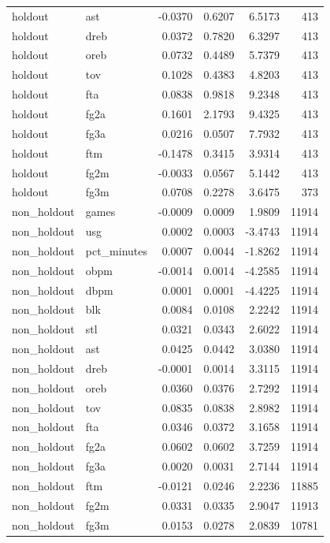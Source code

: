 \begin{table}
\begin{tabular}{llrrrr}
holdout & ast & -0.0370 & 0.6207 & 6.5173 & 413 \\
holdout & dreb & 0.0372 & 0.7820 & 6.3297 & 413 \\
holdout & oreb & 0.0732 & 0.4489 & 5.7379 & 413 \\
holdout & tov & 0.1028 & 0.4383 & 4.8203 & 413 \\
holdout & fta & 0.0838 & 0.9818 & 9.2348 & 413 \\
holdout & fg2a & 0.1601 & 2.1793 & 9.4325 & 413 \\
holdout & fg3a & 0.0216 & 0.0507 & 7.7932 & 413 \\
holdout & ftm & -0.1478 & 0.3415 & 3.9314 & 413 \\
holdout & fg2m & -0.0033 & 0.0567 & 5.1442 & 413 \\
holdout & fg3m & 0.0708 & 0.2278 & 3.6475 & 373 \\
non\_holdout & games & -0.0009 & 0.0009 & 1.9809 & 11914 \\
non\_holdout & usg & 0.0002 & 0.0003 & -3.4743 & 11914 \\
non\_holdout & pct\_minutes & 0.0007 & 0.0044 & -1.8262 & 11914 \\
non\_holdout & obpm & -0.0014 & 0.0014 & -4.2585 & 11914 \\
non\_holdout & dbpm & 0.0001 & 0.0001 & -4.4225 & 11914 \\
non\_holdout & blk & 0.0084 & 0.0108 & 2.2242 & 11914 \\
non\_holdout & stl & 0.0321 & 0.0343 & 2.6022 & 11914 \\
non\_holdout & ast & 0.0425 & 0.0442 & 3.0380 & 11914 \\
non\_holdout & dreb & -0.0001 & 0.0014 & 3.3115 & 11914 \\
non\_holdout & oreb & 0.0360 & 0.0376 & 2.7292 & 11914 \\
non\_holdout & tov & 0.0835 & 0.0838 & 2.8982 & 11914 \\
non\_holdout & fta & 0.0346 & 0.0372 & 3.1658 & 11914 \\
non\_holdout & fg2a & 0.0602 & 0.0602 & 3.7259 & 11914 \\
non\_holdout & fg3a & 0.0020 & 0.0031 & 2.7144 & 11914 \\
non\_holdout & ftm & -0.0121 & 0.0246 & 2.2236 & 11885 \\
non\_holdout & fg2m & 0.0331 & 0.0335 & 2.9047 & 11913 \\
non\_holdout & fg3m & 0.0153 & 0.0278 & 2.0839 & 10781 \\
\bottomrule
\end{tabular}
\end{table}
